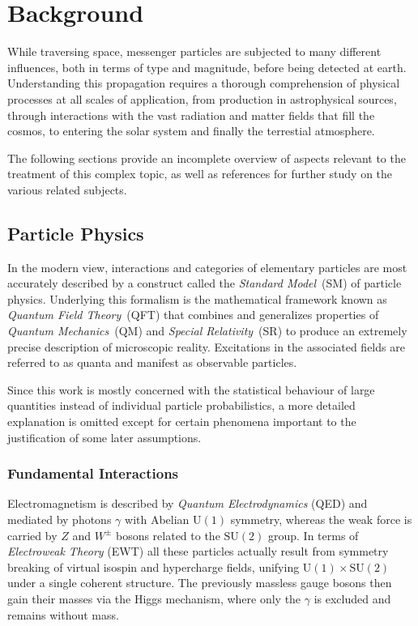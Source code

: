 \chapter{Background}
\label{ch:background}

While traversing space, messenger particles are subjected to many different influences, both in terms of type and magnitude, before being
detected at earth. Understanding this propagation requires a thorough comprehension of physical processes at all scales of application,
from production in astrophysical sources, through interactions with the vast radiation and matter fields that fill the cosmos, to entering
the solar system and finally the terrestial atmosphere.

The following sections provide an incomplete overview of aspects relevant to the treatment of this complex topic, as well as references
for further study on the various related subjects.

\section{Particle Physics}
\label{sec:particle}

In the modern view, interactions and categories of elementary particles are most accurately described by a construct called the
\emph{Standard Model}~(SM) of particle physics. Underlying this formalism is the mathematical framework known as
\emph{Quantum Field Theory}~(QFT) that combines and generalizes properties of \emph{Quantum Mechanics}~(QM) and
\emph{Special Relativity}~(SR) to produce an extremely precise description of microscopic reality. Excitations in the associated
fields are referred to as quanta and manifest as observable particles.

Since this work is mostly concerned with the statistical behaviour of large quantities instead of individual particle probabilistics,
a more detailed explanation is omitted except for certain phenomena important to the justification of some later assumptions.

\subsection*{Fundamental Interactions}
\label{sub:interactions}

Electromagnetism is described by \emph{Quantum Electrodynamics} (QED) and mediated by photons $\gamma$ with Abelian $\text{U}(1)$ symmetry,
whereas the weak force is carried by $Z$ and $W^\pm$ bosons related to the $\text{SU}(2)$ group. In terms of \emph{Electroweak Theory} (EWT)
all these particles actually result from symmetry breaking of virtual isospin and hypercharge fields, unifying $\text{U}(1) \times \text{SU}(2)$
under a single coherent structure. The previously massless gauge bosons then gain their masses via the Higgs mechanism, where only the
$\gamma$ is excluded and remains without mass.

